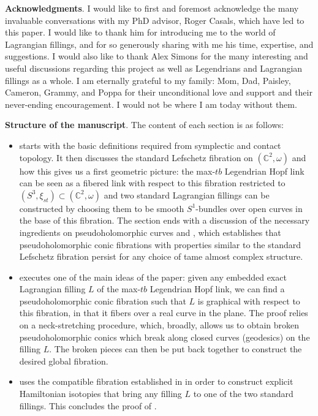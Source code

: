 \documentclass[10pt]{amsart}
\theoremstyle{plain}
\theoremstyle{definition}
\numberwithin{equation}{section}
\newcommand{\C}{\mathbb{C}}
\newcommand{\sse}{\subset}
\begin{document}
{\bf Acknowledgments}. I would like to first and foremost acknowledge the many invaluable conversations with my PhD advisor, Roger Casals, which have led to this paper. I would like to thank him for introducing me to the world of Lagrangian fillings, and for so generously sharing with me his time, expertise, and suggestions.
I would also like to thank Alex Simons for the many interesting and useful discussions regarding this project as well as Legendrians and Lagrangian fillings as a whole.
I am eternally grateful to my family: Mom, Dad, Paisley, Cameron, Grammy, and Poppa for their unconditional love and support and their never-ending encouragement. I would not be where I am today without them.

{\bf Structure of the manuscript}. The content of each section is as follows:
\begin{itemize}
    \item[(i)]  starts with the basic definitions required from symplectic and contact topology. It then discusses the standard Lefschetz fibration on $(\C^2,\omega)$ and how this gives us a first geometric picture: the max-$tb$ Legendrian Hopf link can be seen as a fibered link with respect to this fibration restricted to $(S^3, \xi_{st})\sse (\C^2,\omega)$ and two standard Lagrangian fillings can be constructed by choosing them to be smooth $S^1$-bundles over open curves in the base of this fibration. The section ends with a discussion of the necessary ingredients on pseudoholomorphic curves and , which establishes that pseudoholomorphic conic fibrations with properties similar to the standard Lefschetz fibration persist for any choice of tame almost complex structure.\newline

    \item[(ii)]  executes one of the main ideas of the paper: given any embedded exact Lagrangian filling $L$ of the max-$tb$ Legendrian Hopf link, we can find a pseudoholomorphic conic fibration such that $L$ is graphical with respect to this fibration, in that it fibers over a real curve in the plane. The proof relies on a neck-stretching procedure, which, broadly, allows us to obtain broken pseudoholomorphic conics which break along closed curves (geodesics) on the filling $L$. The broken pieces can then be put back together to construct the desired global fibration.\newline

    \item[(iii)]  uses the compatible fibration established in  in order to construct explicit Hamiltonian isotopies that bring any filling $L$ to one of the two standard fillings. This concludes the proof of .
\end{itemize}
\end{document}
